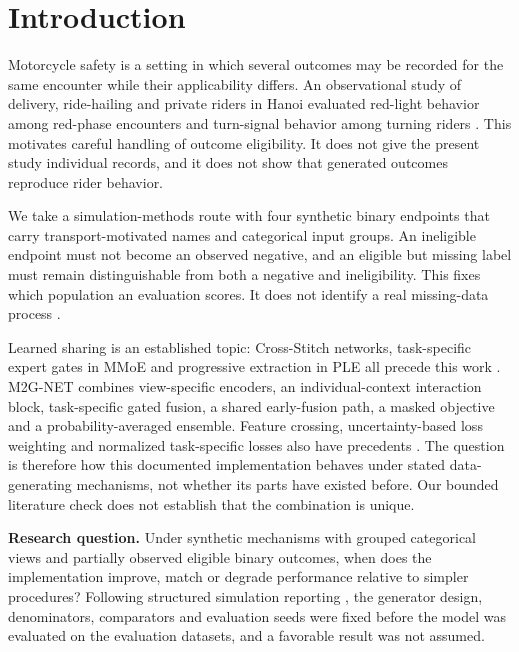 \documentclass[9pt, conference, a4paper, compsocconf]{IEEEtran}
\begin{document}
\IEEEpeerreviewmaketitle

\section{Introduction}
Motorcycle safety is a setting in which several outcomes may be recorded for the same encounter while their applicability differs. An observational study of delivery, ride-hailing and private riders in Hanoi evaluated red-light behavior among red-phase encounters and turn-signal behavior among turning riders \cite{NguyenPhuoc2024same}. This motivates careful handling of outcome eligibility. It does not give the present study individual records, and it does not show that generated outcomes reproduce rider behavior.

We take a simulation-methods route with four synthetic binary endpoints that carry transport-motivated names and categorical input groups. An ineligible endpoint must not become an observed negative, and an eligible but missing label must remain distinguishable from both a negative and ineligibility. This fixes which population an evaluation scores. It does not identify a real missing-data process \cite{RUBIN1976inference}.

Learned sharing is an established topic: Cross-Stitch networks, task-specific expert gates in MMoE and progressive extraction in PLE all precede this work \cite{Misra2016cross,Ma2018modeling,Tang2020progressive}. M2G-NET combines view-specific encoders, an individual-context interaction block, task-specific gated fusion, a shared early-fusion path, a masked objective and a probability-averaged ensemble. Feature crossing, uncertainty-based loss weighting and normalized task-specific losses also have precedents \cite{Wang2017deep,Kendall2018multi,Tang2020progressive}. The question is therefore how this documented implementation behaves under stated data-generating mechanisms, not whether its parts have existed before. Our bounded literature check does not establish that the combination is unique.

\textbf{Research question.} Under synthetic mechanisms with grouped categorical views and partially observed eligible binary outcomes, when does the implementation improve, match or degrade performance relative to simpler procedures? Following structured simulation reporting \cite{Morris2019using}, the generator design, denominators, comparators and evaluation seeds were fixed before the model was evaluated on the evaluation datasets, and a favorable result was not assumed.
\end{document}
